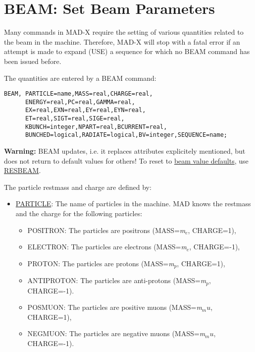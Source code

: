 
\section{BEAM: Set Beam Parameters}
\label{sec:beam}

Many commands in MAD-X require the setting of various quantities related
to the beam in the machine. Therefore, MAD-X will stop with a fatal
error if an attempt is made to expand (USE) a sequence for which no BEAM
command has been issued before.  

The quantities are entered by a BEAM command: 
\begin{verbatim}
BEAM, PARTICLE=name,MASS=real,CHARGE=real,
      ENERGY=real,PC=real,GAMMA=real,
      EX=real,EXN=real,EY=real,EYN=real,
      ET=real,SIGT=real,SIGE=real,
      KBUNCH=integer,NPART=real,BCURRENT=real,
      BUNCHED=logical,RADIATE=logical,BV=integer,SEQUENCE=name;
\end{verbatim} 

{\bf Warning:} BEAM updates, i.e. it replaces attributes explicitely
mentioned, but does not return to default values for others! To reset to
\href{resbeam.html#defaults}{beam value defaults},  use
\href{resbeam.html}{RESBEAM}.

The particle restmass and charge \label{beam_charge} are defined by:
\begin{itemize}
   \item \href{particle}{PARTICLE}: The name of particles in the
     machine. MAD knows the restmass and the charge for the
     following particles:  
     \begin{itemize}
	  \item POSITRON: The particles are positrons (MASS=\textit{m$_e$}, CHARGE=1), 
	  \item ELECTRON: The particles are electrons (MASS=\textit{m$_e$}, CHARGE=-1), 
	  \item PROTON: The particles are protons (MASS=\textit{m$_p$}, CHARGE=1), 
	  \item ANTIPROTON: The particles are anti-protons (MASS=\textit{m$_p$}, CHARGE=-1). 
	  \item POSMUON: The particles are positive muons (MASS=\textit{m$_mu$}, CHARGE=1), 
	  \item NEGMUON: The particles are negative muons (MASS=\textit{m$_mu$}, CHARGE=-1). 
     \end{itemize}
\end{itemize} 

